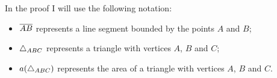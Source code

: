 \begin{notation}
    In the proof I will use the following notation:
    \begin{itemize}
        \item \(\overline{AB}\) represents a line segment bounded by the points \(A\) and \(B\);
        \item \(\triangle_{ABC}\) represents a triangle with vertices \(A\), \(B\) and \(C\);
        \item \(a(\triangle_{ABC})\) represents the area of a triangle with vertices \(A\), \(B\) and \(C\).
    \end{itemize}
\end{notation}